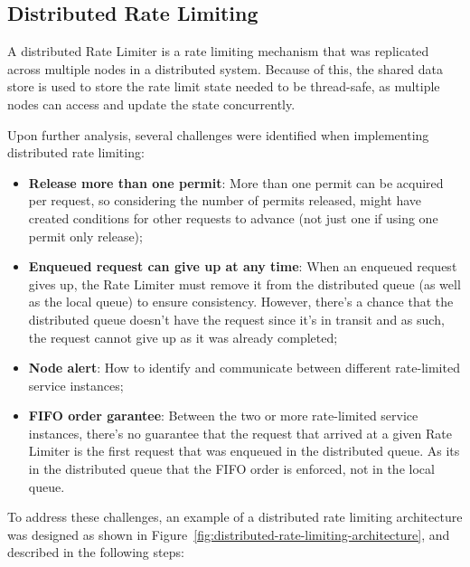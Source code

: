 \subsection{Distributed Rate Limiting}\label{subsec:rate-limiter-distributed}

A distributed Rate Limiter is a rate limiting mechanism
that was replicated across multiple nodes in a distributed system.
Because of this, the shared data store is used to store the rate limit state needed to be thread-safe, as multiple nodes can access and update the state concurrently.

Upon further analysis, several challenges were identified when implementing distributed rate limiting:

\begin{itemize}
    \item \textbf{Release more than one permit}: More than one permit can be acquired per request, so considering the number of permits released, might have created conditions for other requests to advance (not just one if using one permit only release);
    \item \textbf{Enqueued request can give up at any time}: When an enqueued request gives up, the Rate Limiter must remove it from the distributed queue (as well as the local queue) to ensure consistency.
    However, there's a chance that the distributed queue doesn't have the request since it's in transit and as such,
    the request cannot give up as it was already completed;
    \item \textbf{Node alert}:
    How to identify and communicate between different rate-limited service instances;
    \item \textbf{FIFO order garantee}: Between the two or more rate-limited service instances, there's no guarantee that the request that arrived at a given Rate Limiter is the first request that was enqueued in the distributed queue. As its in the distributed queue that the FIFO order is enforced, not in the local queue.
\end{itemize}

To address these challenges, an example of a distributed rate limiting architecture was designed as shown in Figure~\ref{fig:distributed-rate-limiting-architecture}, and described in the following steps:

